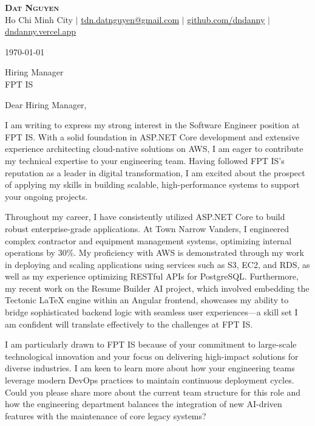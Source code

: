\documentclass[letterpaper,11pt]{article}
\begin{document}
\begin{center}
\textbf{\Huge \scshape Dat Nguyen} \\ \vspace{1pt}
\small Ho Chi Minh City $|$ \href{mailto:tdn.datnguyen@gmail.com}{\underline{tdn.datnguyen@gmail.com}} $|$
\href{https://github.com/dndanny}{\underline{github.com/dndanny}} $|$
\href{https://dndanny.vercel.app}{\underline{dndanny.vercel.app}}
\end{center}

\today

\vspace{20pt}

Hiring Manager \\
FPT IS \\

\vspace{20pt}

Dear Hiring Manager,

I am writing to express my strong interest in the Software Engineer position at FPT IS. With a solid foundation in ASP.NET Core development and extensive experience architecting cloud-native solutions on AWS, I am eager to contribute my technical expertise to your engineering team. Having followed FPT IS's reputation as a leader in digital transformation, I am excited about the prospect of applying my skills in building scalable, high-performance systems to support your ongoing projects.

Throughout my career, I have consistently utilized ASP.NET Core to build robust enterprise-grade applications. At Town Narrow Vanders, I engineered complex contractor and equipment management systems, optimizing internal operations by 30\%. My proficiency with AWS is demonstrated through my work in deploying and scaling applications using services such as S3, EC2, and RDS, as well as my experience optimizing RESTful APIs for PostgreSQL. Furthermore, my recent work on the Resume Builder AI project, which involved embedding the Tectonic LaTeX engine within an Angular frontend, showcases my ability to bridge sophisticated backend logic with seamless user experiences—a skill set I am confident will translate effectively to the challenges at FPT IS.

I am particularly drawn to FPT IS because of your commitment to large-scale technological innovation and your focus on delivering high-impact solutions for diverse industries. I am keen to learn more about how your engineering teams leverage modern DevOps practices to maintain continuous deployment cycles. Could you please share more about the current team structure for this role and how the engineering department balances the integration of new AI-driven features with the maintenance of core legacy systems?
\end{document}
